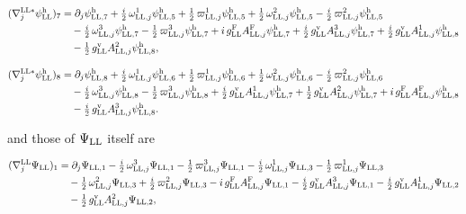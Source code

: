 \documentclass[
  10pt,
]{article}
\begin{document}
\[\begin{aligned}
(\nabla^{{\rm LL}*}_j\psi^{\rm h}_{\rm LL})_7&=\partial_j\psi^{\rm h}_{{\rm LL},7}+\tfrac{i}{2}\,\omega^{1}_{{\rm LL},j}\psi^{\rm h}_{{\rm LL},5}+\tfrac{1}{2}\,\varpi^{1}_{{\rm LL},j}\psi^{\rm h}_{{\rm LL},5}+\tfrac{1}{2}\,\omega^{2}_{{\rm LL},j}\psi^{\rm h}_{{\rm LL},5}-\tfrac{i}{2}\,\varpi^{2}_{{\rm LL},j}\psi^{\rm h}_{{\rm LL},5}\\
&\quad -\tfrac{i}{2}\,\omega^{3}_{{\rm LL},j}\psi^{\rm h}_{{\rm LL},7}-\tfrac{1}{2}\,\varpi^{3}_{{\rm LL},j}\psi^{\rm h}_{{\rm LL},7}+i\,g^{\rm F}_{\rm LL}A^{\rm F}_{{\rm LL},j}\psi^{\rm h}_{{\rm LL},7}+\tfrac{i}{2}\,g^{\rm v}_{\rm LL}A^{3}_{{\rm LL},j}\psi^{\rm h}_{{\rm LL},7}+\tfrac{i}{2}\,g^{\rm v}_{\rm LL}A^{1}_{{\rm LL},j}\psi^{\rm h}_{{\rm LL},8}\\
&\quad -\tfrac{1}{2}\,g^{\rm v}_{\rm LL}A^{2}_{{\rm LL},j}\psi^{\rm h}_{{\rm LL},8},
\end{aligned}\]

\[\begin{aligned}
(\nabla^{{\rm LL}*}_j\psi^{\rm h}_{\rm LL})_8&=\partial_j\psi^{\rm h}_{{\rm LL},8}+\tfrac{i}{2}\,\omega^{1}_{{\rm LL},j}\psi^{\rm h}_{{\rm LL},6}+\tfrac{1}{2}\,\varpi^{1}_{{\rm LL},j}\psi^{\rm h}_{{\rm LL},6}+\tfrac{1}{2}\,\omega^{2}_{{\rm LL},j}\psi^{\rm h}_{{\rm LL},6}-\tfrac{i}{2}\,\varpi^{2}_{{\rm LL},j}\psi^{\rm h}_{{\rm LL},6}\\
&\quad -\tfrac{i}{2}\,\omega^{3}_{{\rm LL},j}\psi^{\rm h}_{{\rm LL},8}-\tfrac{1}{2}\,\varpi^{3}_{{\rm LL},j}\psi^{\rm h}_{{\rm LL},8}+\tfrac{i}{2}\,g^{\rm v}_{\rm LL}A^{1}_{{\rm LL},j}\psi^{\rm h}_{{\rm LL},7}+\tfrac{1}{2}\,g^{\rm v}_{\rm LL}A^{2}_{{\rm LL},j}\psi^{\rm h}_{{\rm LL},7}+i\,g^{\rm F}_{\rm LL}A^{\rm F}_{{\rm LL},j}\psi^{\rm h}_{{\rm LL},8}\\
&\quad -\tfrac{i}{2}\,g^{\rm v}_{\rm LL}A^{3}_{{\rm LL},j}\psi^{\rm h}_{{\rm LL},8}.
\end{aligned}\]

and those of \(\Psi_{\rm LL}\) itself are

\[\begin{aligned}
(\nabla^{\rm LL}_j\Psi_{\rm LL})_1&=\partial_j\Psi_{{\rm LL},1}-\tfrac{i}{2}\,\omega^{3}_{{\rm LL},j}\Psi_{{\rm LL},1}-\tfrac{1}{2}\,\varpi^{3}_{{\rm LL},j}\Psi_{{\rm LL},1}-\tfrac{i}{2}\,\omega^{1}_{{\rm LL},j}\Psi_{{\rm LL},3}-\tfrac{1}{2}\,\varpi^{1}_{{\rm LL},j}\Psi_{{\rm LL},3}\\
&\quad -\tfrac{1}{2}\,\omega^{2}_{{\rm LL},j}\Psi_{{\rm LL},3}+\tfrac{i}{2}\,\varpi^{2}_{{\rm LL},j}\Psi_{{\rm LL},3}-i\,g^{\rm F}_{\rm LL}A^{\rm F}_{{\rm LL},j}\Psi_{{\rm LL},1}-\tfrac{i}{2}\,g^{\rm v}_{\rm LL}A^{3}_{{\rm LL},j}\Psi_{{\rm LL},1}-\tfrac{i}{2}\,g^{\rm v}_{\rm LL}A^{1}_{{\rm LL},j}\Psi_{{\rm LL},2}\\
&\quad -\tfrac{1}{2}\,g^{\rm v}_{\rm LL}A^{2}_{{\rm LL},j}\Psi_{{\rm LL},2},
\end{aligned}\]
\end{document}
